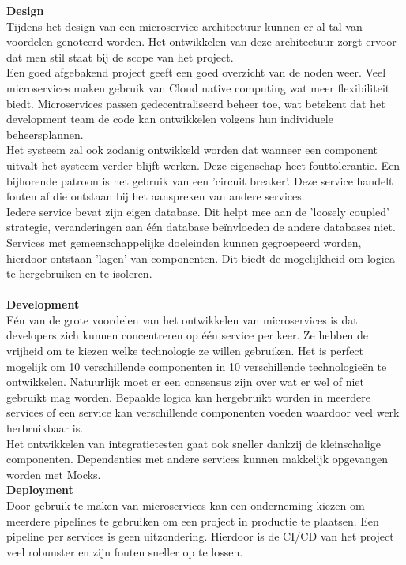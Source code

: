 \textbf{Design}\\ 
Tijdens het design van een microservice-architectuur kunnen er al tal van voordelen genoteerd worden. Het ontwikkelen van deze architectuur zorgt ervoor dat men stil staat bij de scope van het project.\\ 
Een goed afgebakend project geeft een goed overzicht van de noden weer. Veel microservices maken gebruik van Cloud native computing wat meer flexibiliteit biedt. Microservices passen gedecentraliseerd beheer toe, wat betekent dat het development team de code kan ontwikkelen volgens hun individuele beheersplannen.\\ 
Het systeem zal ook zodanig ontwikkeld worden dat wanneer een component uitvalt het systeem verder blijft werken. Deze eigenschap heet fouttolerantie. Een bijhorende patroon is het gebruik van een 'circuit breaker'. Deze service handelt fouten af die ontstaan bij het aanspreken van andere services.\\
Iedere service bevat zijn eigen database. Dit helpt mee aan de 'loosely coupled' strategie, veranderingen aan één database beïnvloeden de andere databases niet.\\
Services met gemeenschappelijke doeleinden kunnen gegroepeerd worden, hierdoor ontstaan 'lagen' van
componenten. Dit biedt de mogelijkheid om logica te hergebruiken en te isoleren.\\ \\
\textbf{Development}\\ Eén van de grote voordelen van het ontwikkelen van microservices is dat developers zich kunnen concentreren op één service per keer. Ze hebben de vrijheid om te kiezen welke technologie ze willen gebruiken. Het is perfect mogelijk om 10 verschillende componenten in 10 verschillende technologieën te ontwikkelen. Natuurlijk moet er een consensus zijn over wat er wel of niet gebruikt mag worden. Bepaalde logica kan hergebruikt worden in meerdere services of een service kan verschillende componenten voeden waardoor veel werk herbruikbaar is. \\
Het ontwikkelen van integratietesten gaat ook sneller dankzij de kleinschalige componenten. Dependenties met andere services kunnen makkelijk opgevangen worden met Mocks.\\
\textbf{Deployment}\\ Door gebruik te maken van microservices kan een onderneming kiezen om meerdere pipelines te gebruiken om een project in productie te plaatsen. Een pipeline per services is geen uitzondering. Hierdoor is de CI/CD van het project veel robuuster en zijn fouten sneller op te lossen.

